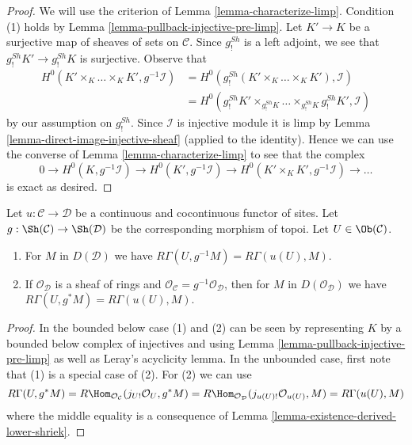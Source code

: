 \begin{proof}
We will use the criterion of Lemma \ref{lemma-characterize-limp}.
Condition (1) holds by Lemma \ref{lemma-pullback-injective-pre-limp}.
Let $K' \to K$ be a surjective map of sheaves of sets on $\mathcal{C}$.
Since $g_!^{Sh}$ is a left adjoint,
we see that $g_!^{Sh}K' \to g_!^{Sh}K$ is surjective.
Observe that
\begin{align*}
H^0(K' \times_K \ldots \times_K K', g^{-1}\mathcal{I}) 
& =
H^0(g_!^{Sh}(K' \times_K \ldots \times_K K'), \mathcal{I}) \\
& =
H^0(g_!^{Sh}K' \times_{g_!^{Sh}K} \ldots \times_{g_!^{Sh}K} g_!^{Sh}K',
\mathcal{I})
\end{align*}
by our assumption on $g_!^{Sh}$. Since $\mathcal{I}$ is injective module
it is limp by Lemma \ref{lemma-direct-image-injective-sheaf}
(applied to the identity). Hence we can use the converse of
Lemma \ref{lemma-characterize-limp} to see that the complex
$$
0 \to H^0(K, g^{-1}\mathcal{I}) \to H^0(K', g^{-1}\mathcal{I}) \to
H^0(K' \times_K K', g^{-1}\mathcal{I}) \to \ldots
$$
is exact as desired.
\end{proof}

\begin{lemma}
\label{lemma-pullback-same-cohomology}
Let $u : \mathcal{C} \to \mathcal{D}$ be a continuous and cocontinuous
functor of sites. Let $g : \Sh(\mathcal{C}) \to \Sh(\mathcal{D})$
be the corresponding morphism of topoi. Let $U \in \Ob(\mathcal{C})$.
\begin{enumerate}
\item For $M$ in $D(\mathcal{D})$ we have
$R\Gamma(U, g^{-1}M) = R\Gamma(u(U), M)$.
\item If $\mathcal{O}_\mathcal{D}$ is a sheaf of rings and
$\mathcal{O}_\mathcal{C} = g^{-1}\mathcal{O}_\mathcal{D}$, then
for $M$ in $D(\mathcal{O}_\mathcal{D})$ we have
$R\Gamma(U, g^*M) = R\Gamma(u(U), M)$.
\end{enumerate}
\end{lemma}

\begin{proof}
In the bounded below case (1) and (2) can be seen by representing
$K$ by a bounded below complex of injectives and using
Lemma \ref{lemma-pullback-injective-pre-limp} as well as
Leray's acyclicity lemma.
In the unbounded case, first note that
(1) is a special case of (2). For (2) we can use
$$
R\Gamma(U, g^*M) =
R\Hom_{\mathcal{O}_\mathcal{C}}(j_{U!}\mathcal{O}_U, g^*M) =
R\Hom_{\mathcal{O}_\mathcal{D}}(j_{u(U)!}\mathcal{O}_{u(U)}, M) =
R\Gamma(u(U), M)
$$
where the middle equality is a consequence of
Lemma \ref{lemma-existence-derived-lower-shriek}.
\end{proof}

